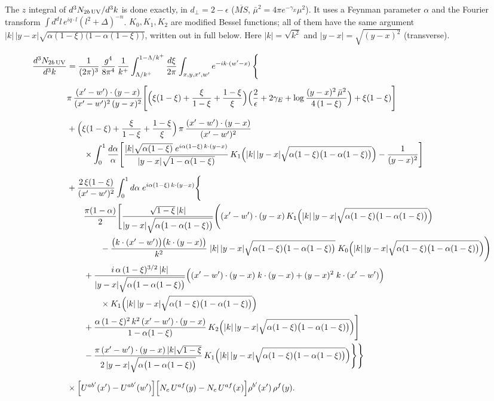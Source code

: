 \documentclass[10pt]{article}
\begin{document}
\noindent The $z$ integral of $d^{3}N_{2b\,\rm UV}/d^{3}k$ is done exactly, in $d_{\perp}=2-\epsilon$ ($\overline{MS}$, $\bar\mu^{2}=4\pi e^{-\gamma_{E}}\mu^{2}$). It uses a Feynman parameter $\alpha$ and the Fourier transform $\int d^{d}l\,e^{iq\cdot l}(l^{2}+\Delta)^{-n}$. $K_{0},K_{1},K_{2}$ are modified Bessel functions; all of them have the same argument
$|k|\,|y-x|\sqrt{\alpha(1-\xi)\big(1-\alpha(1-\xi)\big)}$, written out in full below. Here $|k|=\sqrt{k^{2}}$ and $|y-x|=\sqrt{(y-x)^{2}}$ (transverse).

\begin{align}
\frac{d^{3}N_{2b\,\rm UV}}{d^{3}k}&=\frac{1}{(2\pi)^{3}}\,\frac{g^{4}}{8\pi^{4}}\,\frac{1}{k^{+}}\int_{\Lambda/k^{+}}^{1-\Lambda/k^{+}}\frac{d\xi}{2\pi}\int_{x,y,x',w'}e^{-ik\cdot(w'-x)}\,\Bigg\{\notag\\[4pt]
&\pi\,\frac{(x'-w')\cdot(y-x)}{(x'-w')^{2}\,(y-x)^{2}}\Bigg[\Big(\xi(1-\xi)+\frac{\xi}{1-\xi}+\frac{1-\xi}{\xi}\Big)\Big(\frac{2}{\epsilon}+2\gamma_{E}+\log\frac{(y-x)^{2}\,\bar\mu^{2}}{4\,(1-\xi)}\Big)+\xi(1-\xi)\Bigg]\notag\\[6pt]
&+\Big(\xi(1-\xi)+\frac{\xi}{1-\xi}+\frac{1-\xi}{\xi}\Big)\,\pi\,\frac{(x'-w')\cdot(y-x)}{(x'-w')^{2}}\notag\\&\qquad\times\int_{0}^{1}\frac{d\alpha}{\alpha}\Bigg[\frac{|k|\sqrt{\alpha(1-\xi)}\;e^{i\alpha(1-\xi)\,k\cdot(y-x)}}{|y-x|\sqrt{1-\alpha(1-\xi)}}\,K_{1}\Big(|k|\,|y-x|\sqrt{\alpha(1-\xi)\big(1-\alpha(1-\xi)\big)}\Big)-\frac{1}{(y-x)^{2}}\Bigg]\notag\\[6pt]
&+\frac{2\,\xi(1-\xi)}{(x'-w')^{2}}\int_{0}^{1}d\alpha\;e^{i\alpha(1-\xi)\,k\cdot(y-x)}\Bigg\{\notag\\&\qquad\frac{\pi(1-\alpha)}{2}\Bigg[\frac{\sqrt{1-\xi}\,|k|}{|y-x|\sqrt{\alpha\big(1-\alpha(1-\xi)\big)}}\Bigg((x'-w')\cdot(y-x)\,K_{1}\Big(|k|\,|y-x|\sqrt{\alpha(1-\xi)\big(1-\alpha(1-\xi)\big)}\Big)\notag\\
&\qquad\qquad-\frac{\big(k\cdot(x'-w')\big)\big(k\cdot(y-x)\big)}{k^{2}}\;|k|\,|y-x|\sqrt{\alpha(1-\xi)\big(1-\alpha(1-\xi)\big)}\;K_{0}\Big(|k|\,|y-x|\sqrt{\alpha(1-\xi)\big(1-\alpha(1-\xi)\big)}\Big)\Bigg)\notag\\
&\qquad+\frac{i\,\alpha\,(1-\xi)^{3/2}\,|k|}{|y-x|\sqrt{\alpha\big(1-\alpha(1-\xi)\big)}}\Big((x'-w')\cdot(y-x)\;k\cdot(y-x)+(y-x)^{2}\;k\cdot(x'-w')\Big)\notag\\&\qquad\qquad\times K_{1}\Big(|k|\,|y-x|\sqrt{\alpha(1-\xi)\big(1-\alpha(1-\xi)\big)}\Big)\notag\\
&\qquad+\frac{\alpha\,(1-\xi)^{2}\,k^{2}\,(x'-w')\cdot(y-x)}{1-\alpha(1-\xi)}\,K_{2}\Big(|k|\,|y-x|\sqrt{\alpha(1-\xi)\big(1-\alpha(1-\xi)\big)}\Big)\Bigg]\notag\\
&\qquad-\frac{\pi\,(x'-w')\cdot(y-x)\,|k|\sqrt{1-\xi}}{2\,|y-x|\sqrt{\alpha\big(1-\alpha(1-\xi)\big)}}\,K_{1}\Big(|k|\,|y-x|\sqrt{\alpha(1-\xi)\big(1-\alpha(1-\xi)\big)}\Big)\Bigg\}\Bigg\}\notag\\[6pt]
&\times\Big[U^{ab'}(x')-U^{ab'}(w')\Big]\Big[N_{c}\,U^{af}(y)-N_{c}\,U^{af}(x)\Big]\rho^{b'}(x')\,\rho^{f}(y).
\end{align}
\end{document}
